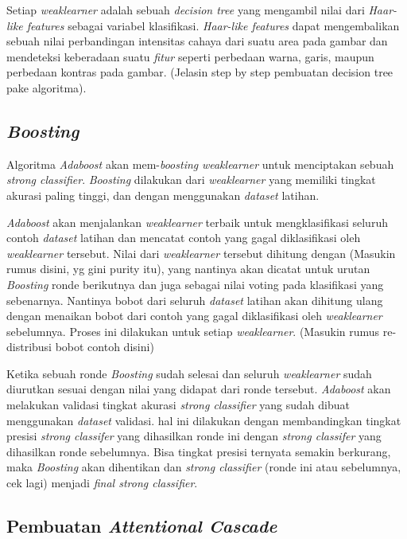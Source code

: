 Setiap \emph{weaklearner} adalah sebuah \emph{decision tree} yang mengambil nilai 
dari \emph{Haar-like features} sebagai variabel klasifikasi.
\emph{Haar-like features} dapat mengembalikan 
sebuah nilai perbandingan intensitas cahaya dari suatu area pada gambar dan 
mendeteksi keberadaan suatu \emph{fitur} seperti 
perbedaan warna, garis, maupun perbedaan kontras pada gambar. 
(Jelasin step by step pembuatan decision tree pake algoritma).

\subsection{\emph{Boosting}}

Algoritma \emph{Adaboost} akan mem-\emph{boosting} \emph{weaklearner} untuk 
menciptakan sebuah \emph{strong classifier}. \emph{Boosting} dilakukan dari 
\emph{weaklearner} yang memiliki tingkat akurasi paling tinggi, dan dengan 
menggunakan \emph{dataset} latihan.

\emph{Adaboost} akan menjalankan \emph{weaklearner} terbaik untuk 
mengklasifikasi seluruh contoh \emph{dataset} latihan dan mencatat contoh yang 
gagal diklasifikasi oleh \emph{weaklearner} tersebut. Nilai dari \emph{weaklearner} 
tersebut dihitung dengan (Masukin rumus disini, yg gini purity itu), yang nantinya 
akan dicatat untuk urutan \emph{Boosting} ronde berikutnya dan juga sebagai nilai 
voting pada klasifikasi yang sebenarnya. 
Nantinya bobot dari seluruh \emph{dataset} latihan akan dihitung ulang dengan menaikan bobot dari contoh 
yang gagal diklasifikasi oleh \emph{weaklearner} sebelumnya. Proses ini dilakukan 
untuk setiap \emph{weaklearner}. (Masukin rumus re-distribusi bobot contoh disini)

Ketika sebuah ronde \emph{Boosting} sudah selesai dan seluruh \emph{weaklearner} sudah  diurutkan sesuai dengan 
nilai yang didapat dari ronde tersebut. \emph{Adaboost} akan melakukan validasi 
tingkat akurasi \emph{strong classifier} yang sudah dibuat menggunakan \emph{dataset} validasi. 
hal ini dilakukan dengan membandingkan tingkat presisi \emph{strong classifer} 
yang dihasilkan ronde ini dengan \emph{strong classifer} yang dihasilkan ronde 
sebelumnya. Bisa tingkat presisi ternyata semakin berkurang, maka \emph{Boosting} 
akan dihentikan dan \emph{strong classifier} (ronde ini atau sebelumnya, cek lagi) 
menjadi \emph{final strong classifier}.

\subsection{Pembuatan \emph{Attentional Cascade}}


